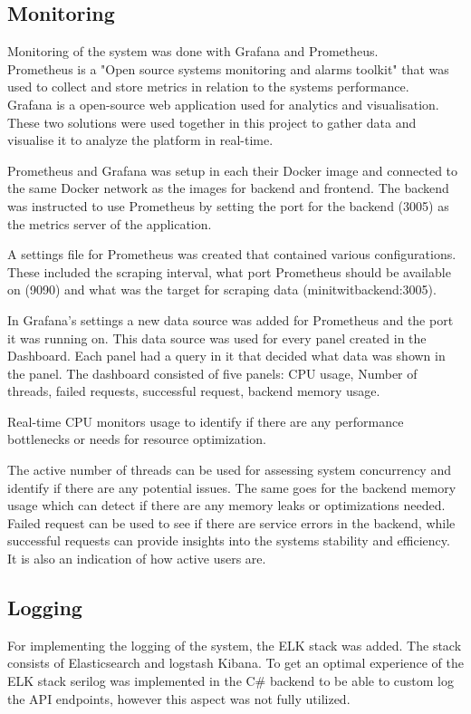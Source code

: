\subsection{Monitoring}

Monitoring of the system was done with Grafana and Prometheus.\\
Prometheus is a "Open source systems monitoring and alarms toolkit" that was used to collect and store metrics in relation to the systems performance. \\
Grafana is a open-source web application used for analytics and visualisation. These two solutions were used together in this project to gather data and visualise it to analyze the platform in real-time.

Prometheus and Grafana was setup in each their Docker image and connected to the same Docker network as the images for backend and frontend. The backend was instructed to use Prometheus by setting the port for the backend (3005) as the metrics server of the application. 

A settings file for Prometheus was created that contained various configurations. These included the scraping interval, what port Prometheus should be available on (9090) and what was the target for scraping data (minitwitbackend:3005).

In Grafana's settings a new data source was added for Prometheus and the port it was running on. This data source was used for every panel created in the Dashboard. Each panel had a query in it that decided what data was shown in the panel. The dashboard consisted of five panels: CPU usage, Number of threads, failed requests, successful request, backend memory usage.

Real-time CPU monitors usage to identify if there are any performance bottlenecks or needs for resource optimization.

The active number of threads can be used for assessing system concurrency and identify if there are any potential issues. The same goes for the backend memory usage which can detect if there are any memory leaks or optimizations needed.\\
Failed  request can be used to see if there are service errors in the backend, while successful requests can provide insights into the systems stability and efficiency. It is also an indication of how active users are.

\subsection{Logging}
For implementing the logging of the system, the ELK stack was added. The stack consists of Elasticsearch and logstash Kibana. To get an optimal experience of the ELK stack serilog was implemented in the C\# backend to be able to custom log the API endpoints, however this aspect was not fully utilized.